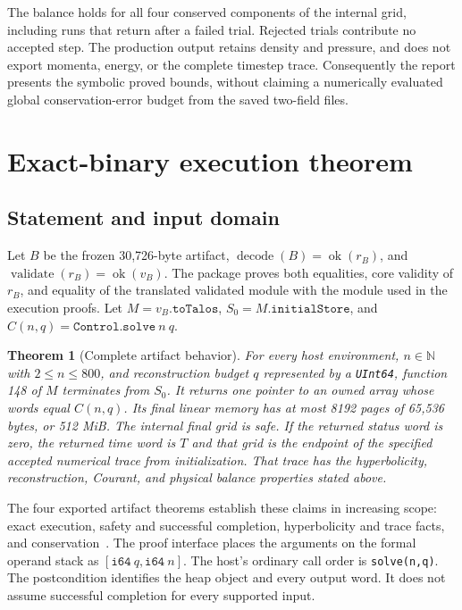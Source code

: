 \documentclass[11pt]{article}
\newcommand{\code}[1]{\texttt{#1}}
\newcommand{\NN}{\mathbb{N}}
\newtheorem{theorem}{Theorem}[section]
\begin{document}
The balance holds for all four conserved components of the internal grid, including runs that return after a failed trial.  Rejected trials contribute no accepted step.  The production output retains density and pressure, and does not export momenta, energy, or the complete timestep trace.  Consequently the report presents the symbolic proved bounds, without claiming a numerically evaluated global conservation-error budget from the saved two-field files.

\section{Exact-binary execution theorem}

\subsection{Statement and input domain}

Let $B$ be the frozen 30,726-byte artifact, $\operatorname{decode}(B)=\operatorname{ok}(r_B)$, and $\operatorname{validate}(r_B)=\operatorname{ok}(v_B)$.  The package proves both equalities, core validity of $r_B$, and equality of the translated validated module with the module used in the execution proofs.  Let $M=v_B.\code{toTalos}$, $S_0=M.\code{initialStore}$, and $C(n,q)=\code{Control.solve}\ n\ q$.

\begin{theorem}[Complete artifact behavior]
\label{thm:artifact}
For every host environment, $n\in\NN$ with $2\leq n\leq800$, and reconstruction budget $q$ represented by a \code{UInt64}, function 148 of $M$ terminates from $S_0$.  It returns one pointer to an owned array whose words equal $C(n,q)$.  Its final linear memory has at most 8192 pages of 65,536 bytes, or 512 MiB.  The internal final grid is safe.  If the returned status word is zero, the returned time word is $T$ and that grid is the endpoint of the specified accepted numerical trace from initialization.  That trace has the hyperbolicity, reconstruction, Courant, and physical balance properties stated above.
\end{theorem}

The four exported artifact theorems establish these claims in increasing scope: exact execution, safety and successful completion, hyperbolicity and trace facts, and conservation~\cite{spec,artifact}.  The proof interface places the arguments on the formal operand stack as $[\code{i64}\ q,\code{i64}\ n]$.  The host's ordinary call order is \code{solve(n,q)}.  The postcondition identifies the heap object and every output word.  It does not assume successful completion for every supported input.
\end{document}
